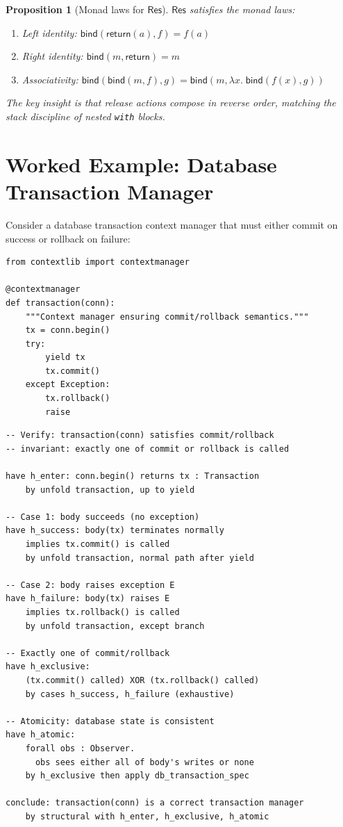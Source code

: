 \documentclass[11pt,a4paper]{report}
\theoremstyle{definition}
\theoremstyle{plain}
\newtheorem{proposition}[definition]{Proposition}
\begin{document}
\begin{proposition}[Monad laws for $\mathsf{Res}$]
$\mathsf{Res}$ satisfies the monad laws:
\begin{enumerate}
  \item Left identity: $\mathsf{bind}(\mathsf{return}(a), f) = f(a)$
  \item Right identity: $\mathsf{bind}(m, \mathsf{return}) = m$
  \item Associativity: $\mathsf{bind}(\mathsf{bind}(m, f), g)
    = \mathsf{bind}(m, \lambda x.\;\mathsf{bind}(f(x), g))$
\end{enumerate}
The key insight is that release actions compose in reverse order,
matching the stack discipline of nested \texttt{with} blocks.
\end{proposition}

\section{Worked Example: Database Transaction Manager}

Consider a database transaction context manager that must either commit
on success or rollback on failure:

\begin{lstlisting}[style=python]
from contextlib import contextmanager

@contextmanager
def transaction(conn):
    """Context manager ensuring commit/rollback semantics."""
    tx = conn.begin()
    try:
        yield tx
        tx.commit()
    except Exception:
        tx.rollback()
        raise
\end{lstlisting}

\begin{lstlisting}[style=proof]
-- Verify: transaction(conn) satisfies commit/rollback
-- invariant: exactly one of commit or rollback is called

have h_enter: conn.begin() returns tx : Transaction
    by unfold transaction, up to yield

-- Case 1: body succeeds (no exception)
have h_success: body(tx) terminates normally
    implies tx.commit() is called
    by unfold transaction, normal path after yield

-- Case 2: body raises exception E
have h_failure: body(tx) raises E
    implies tx.rollback() is called
    by unfold transaction, except branch

-- Exactly one of commit/rollback
have h_exclusive:
    (tx.commit() called) XOR (tx.rollback() called)
    by cases h_success, h_failure (exhaustive)

-- Atomicity: database state is consistent
have h_atomic:
    forall obs : Observer.
      obs sees either all of body's writes or none
    by h_exclusive then apply db_transaction_spec

conclude: transaction(conn) is a correct transaction manager
    by structural with h_enter, h_exclusive, h_atomic
\end{lstlisting}
\end{document}
